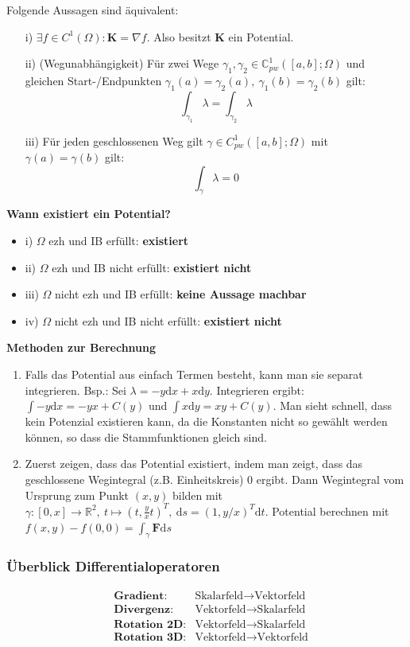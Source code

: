 \documentclass[8pt, a4paper, landscape, fleqn]{scrartcl}
\newenvironment {annotation}[1]
				{\begin{itshape} \begin{small} \textbf{#1} \begin{itemize}}
				{\end{itemize} \end{small} \end{itshape}}
\def\R{\mathbb{R}}
\def\C{\mathbb{C}}
\def\d{\text{d}}
\def\K{\mathbf{K}}
\begin{document}
\begin{multicols*}{3}
				Folgende Aussagen sind äquivalent: 
				\begin{enumerate}
				    \item[i)] $\exists f \in C^1(\Omega) : \K = \nabla f$. Also besitzt $\K$ ein Potential.
				    \item[ii)] (Wegunabhängigkeit) Für zwei Wege $\gamma_1, \gamma_2 \in \C_{pw}^1([a, b]; \Omega)$ und gleichen Start-/Endpunkten $\gamma_1(a) = \gamma_2(a),\ \gamma_1(b) = \gamma_2(b)$ gilt: \[\int_{\gamma_1} \lambda = \int_{\gamma_2} \lambda\] 
				    \item[iii)] Für jeden geschlossenen Weg gilt $\gamma \in C_{pw}^1([a, b]; \Omega)$ mit $\gamma(a) = \gamma(b)$ gilt: \[\int_\gamma \lambda = 0\]
				\end{enumerate}
				\begin{annotation}{Wann existiert ein Potential?}
				    \item[i)] $\Omega$ ezh und IB erfüllt: \textbf{existiert}
				    \item[ii)] $\Omega$ ezh und IB nicht erfüllt: \textbf{existiert nicht}
				    \item[iii)] $\Omega$ nicht ezh und IB erfüllt: \textbf{keine Aussage machbar}
				    \item[iv)] $\Omega$ nicht ezh und IB nicht erfüllt: \textbf{existiert nicht}
				\end{annotation}
				\textbf{Methoden zur Berechnung}
				\begin{enumerate}
				    \item Falls das Potential aus einfach Termen besteht, kann man sie separat integrieren. Bsp.: Sei $\lambda = -y \d x + x \d y$. Integrieren ergibt: $\int -y \d x = -yx + C(y)$ und $\int x \d y = xy + C(y)$. Man sieht schnell, dass kein Potenzial existieren kann, da die Konstanten nicht so gewählt werden können, so dass die Stammfunktionen gleich sind.
				    \item Zuerst zeigen, dass das Potential existiert, indem man zeigt, dass das geschlossene Wegintegral (z.B. Einheitskreis) 0 ergibt. Dann Wegintegral vom Ursprung zum Punkt $(x, y)$ bilden mit $\gamma : [0, x]\to\R^2, \ t \mapsto (t, \frac{y}{x}t)^T, \ \d s = (1, y/x)^T \d t$. Potential berechnen mit $f(x, y) - f(0, 0) = \int_\gamma \mathbf F \d s$
				\end{enumerate}
				
				
				
				\subsubsection{Überblick Differentialoperatoren}
				\begin{align*}
				    &\textbf{Gradient:} &\text{Skalarfeld}\rightarrow\text{Vektorfeld}\\
				    &\textbf{Divergenz:} &\text{Vektorfeld}\rightarrow\text{Skalarfeld}\\
				    &\textbf{Rotation 2D:} &\text{Vektorfeld}\rightarrow\text{Skalarfeld}\\
				    &\textbf{Rotation 3D:} &\text{Vektorfeld}\rightarrow\text{Vektorfeld}
				\end{align*}

\end{multicols*}
\end{document}
